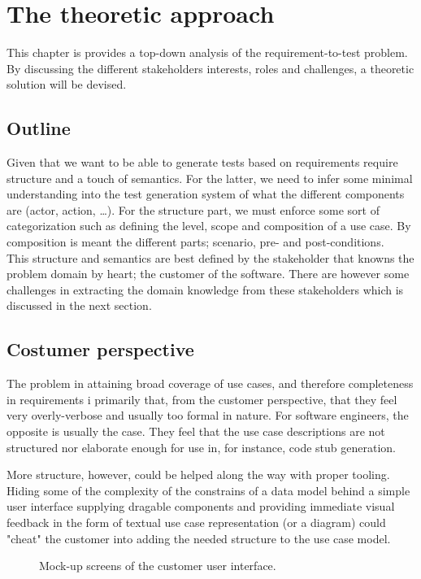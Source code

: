 \chapter{The theoretic approach}
This chapter is provides a top-down analysis of the requirement-to-test problem. By discussing the different stakeholders interests, roles and challenges, a theoretic solution will be devised.

\section{Outline}
Given that we want to be able to generate tests based on requirements require structure and a touch of semantics. For the latter, we need to infer some minimal understanding into the test generation system of what the different components are (actor, action, \dots). For the structure part, we must enforce some sort of categorization such as defining the level, scope and composition of a use case. By composition is meant the different parts; scenario, pre- and post-conditions.\\
This structure and semantics are best defined by the stakeholder that knowns the problem domain by heart; the customer of the software. There are however some challenges in extracting the domain knowledge from these stakeholders which is discussed in the next section.

\section{Costumer perspective}
The problem in attaining broad coverage of use cases, and therefore completeness in requirements i primarily that, from the customer perspective, that they feel very overly-verbose and usually too formal in nature. For software engineers, the opposite is usually the case. They feel that the use case descriptions are not structured nor elaborate enough for use in, for instance, code stub generation.

More structure, however, could be helped along the way with proper tooling. Hiding some of the complexity of the constrains of a data model behind a simple user interface supplying dragable components and providing immediate visual feedback in the form of textual use case representation (or a diagram) could "cheat" the customer into adding the needed structure to the use case model.
\begin{figure}[!htbp]
  \centering
    
  \caption{Mock-up screens of the customer user interface.}
\end{figure}


